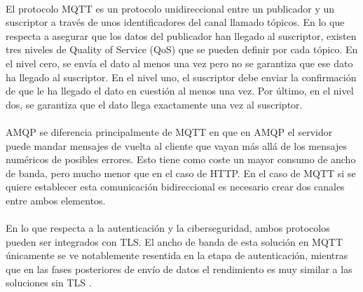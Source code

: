 \paragraph{}
El protocolo MQTT es un protocolo unidireccional entre un publicador y un suscriptor a través de unos identificadores del canal llamado tópicos. En lo que respecta a asegurar que los datos del publicador han llegado al suscriptor, existen tres niveles de Quality of Service (QoS) que se pueden definir por cada tópico. En el nivel cero, se envía el dato al menos una vez pero no se garantiza que ese dato ha llegado al suscriptor. En el nivel uno, el suscriptor debe enviar la confirmación de que le ha llegado el dato en cuestión al menos una vez. Por último, en el nivel dos, se garantiza que el dato llega exactamente una vez al suscriptor.

\paragraph{}
AMQP se diferencia principalmente de MQTT en que en AMQP el servidor puede mandar mensajes de vuelta al cliente que vayan más allá de los mensajes numéricos de posibles errores. Esto tiene como coste un mayor consumo de ancho de banda, pero mucho menor que en el caso de HTTP. En el caso de MQTT si se quiere establecer esta comunicación bidireccional es necesario crear dos canales entre ambos elementos.

\paragraph{}
En lo que respecta a la autenticación y la ciberseguridad, ambos protocolos pueden ser integrados con TLS. El ancho de banda de esta solución en MQTT únicamente se ve notablemente resentida en la etapa de autenticación, mientras que en las fases posteriores de envío de datos el rendimiento es muy similar a las soluciones sin TLS \citep{hivemq}.

